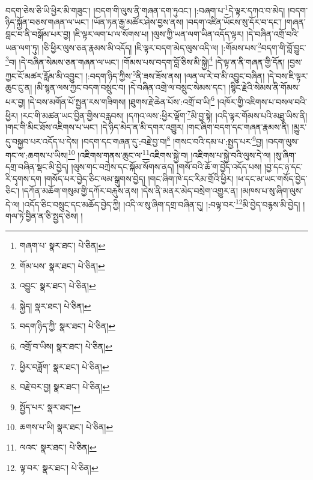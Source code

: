 བདག་ཅེས་ཅི་ཡི་ཕྱིར་མི་གཟུང་། །བདག་གི་ལུས་ནི་གཞན་དག་ཏུའང་། །:བཞག་པ་\footnote{གཞག་པ་  སྣར་ཐང་།  པེ་ཅིན། }དེ་ལྟར་དཀའ་བ་མེད། །བདག་ཉིད་སྐྱོན་བཅས་གཞན་ལ་ཡང་། །ཡོན་ཏན་རྒྱ་མཚོར་ཤེས་བྱས་ནས། །བདག་འཛིན་ཡོངས་སུ་དོར་བ་དང་། །གཞན་བླང་བ་ནི་བསྒོམ་པར་བྱ། །ཇི་ལྟར་ལག་པ་ལ་སོགས་པ། །ལུས་ཀྱི་ཡན་ལག་ཡིན་འདོད་ལྟར། །དེ་བཞིན་འགྲོ་བའི་ཡན་ལག་ཏུ། །ཅི་ཕྱིར་ལུས་ཅན་རྣམས་མི་འདོད། །ཇི་ལྟར་བདག་མེད་ལུས་འདི་ལ། །:གོམས་པས་\footnote{གོམ་པས་  སྣར་ཐང་།  པེ་ཅིན། }བདག་གི་བློ་བྱུང་\footnote{འབྱུང་  སྣར་ཐང་།  པེ་ཅིན། }བ། །དེ་བཞིན་སེམས་ཅན་གཞན་ལ་ཡང་། །གོམས་པས་བདག་བློ་ཅིས་མི་སྐྱེ།\footnote{སྐྱེད།  སྣར་ཐང་།  པེ་ཅིན། } །དེ་ལྟ་ན་ནི་གཞན་གྱི་དོན། །བྱས་ཀྱང་ངོ་མཚར་རློམ་མི་འབྱུང་། །:བདག་ཉིད་ཀྱིས་\footnote{བདག་ཉིད་ཀྱི་  སྣར་ཐང་།  པེ་ཅིན། }ནི་ཟས་ཟོས་ནས། །ལན་ལ་རེ་བ་མི་འབྱུང་བཞིན། །དེ་བས་ཇི་ལྟར་ཆུང་ངུ་ན། །མི་སྙན་ལས་ཀྱང་བདག་བསྲུང་བ། །དེ་བཞིན་འགྲེ་ལ་བསྲུང་སེམས་དང་། །སྙིང་རྗེའི་སེམས་ནི་གོམས་པར་བྱ། །དེ་བས་མགོན་པོ་སྤྱན་རས་གཟིགས། །ཐུགས་རྗེ་ཆེན་པོས་:འགྲོ་བ་ཡི།\footnote{འགྲོ་བ་ཡིས།  སྣར་ཐང་།  པེ་ཅིན། } །འཁོར་གྱི་འཇིགས་པ་བསལ་བའི་ཕྱིར། །རང་གི་མཚན་ཡང་བྱིན་གྱིས་བརླབས། །དཀའ་ལས་:ཕྱིར་ལྡོག་\footnote{ཕྱིར་བཟློག་  སྣར་ཐང་།  པེ་ཅིན། }མི་བྱ་སྟེ། །འདི་ལྟར་གོམས་པའི་མཐུ་ཡིས་ནི། །གང་གི་མིང་ཐོས་འཇིགས་པ་ཡང་། །དེ་ཉིད་མེད་ན་མི་དགར་འགྱུར། །གང་ཞིག་བདག་དང་གཞན་རྣམས་ནི། །མྱུར་དུ་བསྐྱབ་པར་འདོད་པ་དེས། །བདག་དང་གཞན་དུ་:བརྗེ་བྱ་བ།\footnote{བརྗེ་བར་བྱ།  སྣར་ཐང་།  པེ་ཅིན། } །གསང་བའི་དམ་པ་:སྤྱད་པར་\footnote{སྤྱོད་པར་  སྣར་ཐང་། }བྱ། །བདག་ལུས་གང་ལ་:ཆགས་པ་ཡིས།\footnote{ཆགས་པ་ཡི།  སྣར་ཐང་།  པེ་ཅིན། } །འཇིགས་གནས་ཆུང་ལ་\footnote{ལའང་  སྣར་ཐང་།  པེ་ཅིན། }འཇིགས་སྐྱེ་བ། །འཇིགས་པ་སྐྱེ་བའི་ལུས་དེ་ལ། །སུ་ཞིག་དགྲ་བཞིན་སྡང་མི་བྱེད། །ལུས་གང་བཀྲེས་དང་སྐོམ་སོགས་ནད། །གསོ་བའི་ཆོ་ག་བྱེད་འདོད་པས། །བྱ་དང་ཉ་དང་རི་དྭགས་དག །གསོད་པར་བྱེད་ཅིང་ལམ་སྒུགས་བྱེད། །གང་ཞིག་ཁེ་དང་རིམ་གྲོའི་ཕྱིར། །ཕ་དང་མ་ཡང་གསོད་བྱེད་ཅིང་། །དཀོན་མཆོག་གསུམ་གྱི་དཀོར་བརྐུས་ནས། །དེས་ནི་མནར་མེད་བསྲེག་འགྱུར་ན། །མཁས་པ་སུ་ཞིག་ལུས་དེ་ལ། །འདོད་ཅིང་བསྲུང་དང་མཆོད་བྱེད་ཀྱི། །འདི་ལ་སུ་ཞིག་དགྲ་བཞིན་དུ། །:བལྟ་བར་\footnote{ལྟ་བར་  སྣར་ཐང་།  པེ་ཅིན། }མི་བྱེད་བརྙས་མི་བྱེད། །གལ་ཏེ་བྱིན་ན་ཅི་སྤྱད་ཅེས། །

